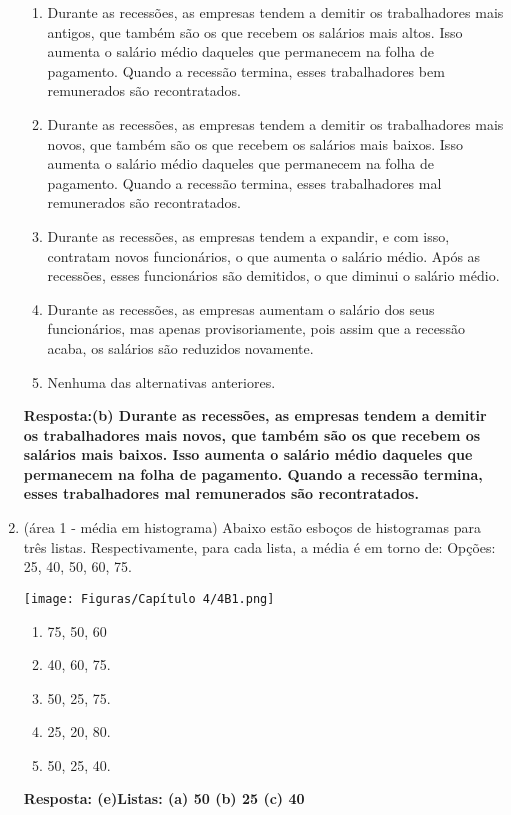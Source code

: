 \documentclass[12pt]{article}\documentclass[brazilian,12pt,a4paper,final]{article}
\begin{document}
\begin{enumerate}
\begin{enumerate}
    \item Durante as recessões, as empresas tendem a demitir os trabalhadores mais antigos, que
também são os que recebem os salários mais altos. Isso aumenta o salário médio daqueles que permanecem na folha de pagamento.
Quando a recessão termina, esses trabalhadores bem remunerados são recontratados.
    \item Durante as recessões, as empresas tendem a demitir os trabalhadores mais novos, que
também são os que recebem os salários mais baixos. Isso aumenta o salário médio daqueles que permanecem na folha de pagamento.
Quando a recessão termina, esses trabalhadores mal remunerados são recontratados.
    \item Durante as recessões, as empresas tendem a expandir, e com isso, contratam novos funcionários, o que aumenta o salário médio.
    Após as recessões, esses funcionários são demitidos, o que diminui o salário médio.
    \item Durante as recessões, as empresas aumentam o salário dos seus funcionários, mas apenas provisoriamente, pois assim que a recessão acaba, os salários são reduzidos novamente.
    \item Nenhuma das alternativas anteriores.
\end{enumerate}

\textbf{Resposta:(b) Durante as recessões, as empresas tendem a demitir os trabalhadores mais novos, que
também são os que recebem os salários mais baixos. Isso aumenta o salário médio daqueles que permanecem na folha de pagamento.
Quando a recessão termina, esses trabalhadores mal remunerados são recontratados.}


\item (área 1 - média em histograma) Abaixo estão esboços de histogramas para três listas. Respectivamente, para cada lista, a
média é em torno de: Opções: 25, 40, 50, 60, 75.

\texttt{[image: Figuras/Capítulo 4/4B1.png]}

\begin{enumerate}
    \item 75, 50, 60
    \item 40, 60, 75.
    \item 50, 25, 75.
    \item 25, 20, 80.
    \item 50, 25, 40.
\end{enumerate}

\textbf{Resposta: (e)Listas: (a) 50 (b) 25 (c) 40}


\end{enumerate}
\end{document}
